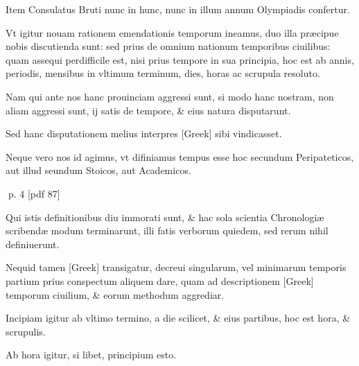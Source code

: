 \begin{parnumbers}
Item Consulatus Bruti nunc in hunc, nunc in illum annum Olympiadis confertur.

Vt igitur nouam rationem emendationis temporum ineamus, duo illa præcipue nobis discutienda sunt: sed 
prius  de omnium nationum temporibus ciuilibus: quam assequi perdifficile est, nisi prius tempore in sua principia, hoc est ab annis, periodis, mensibus in vltimum terminum, dies, horas ac scrupula resoluto.

Nam qui ante nos hanc prouinciam aggressi sunt, si modo hanc nostram, non aliam aggressi sunt, ij satis de tempore, \& eius natura disputarunt.

Sed hanc disputationem melius interpres \textgreek{[Greek]} sibi vindicasset.

Neque vero nos id agimus, vt difiniamus tempus esse hoc secundum Peripateticos, aut illud seundum Stoicos, aut Academicos.

\end{parnumbers}
\clearpage
p. 4 [pdf 87]

\begin{parnumbers}

Qui istis definitionibus diu immorati sunt, \& hac sola scientia Chronologiæ scribendæ modum terminarunt, illi fatis  verborum quiedem, sed rerum nihil definiuerunt.

Nequid tamen \textgreek{[Greek]} transigatur, decreui singularum, vel minimarum temporis partium prius conspectum aliquem dare, quam ad descriptionem \textgreek{[Greek]} temporum ciuilium, \& eorum methodum aggrediar.

Incipiam igitur ab vltimo termino, a die scilicet, \& eius partibus, hoc est hora, \& scrupulis.

Ab hora igitur, si libet, principium esto.
\end{parnumbers}

